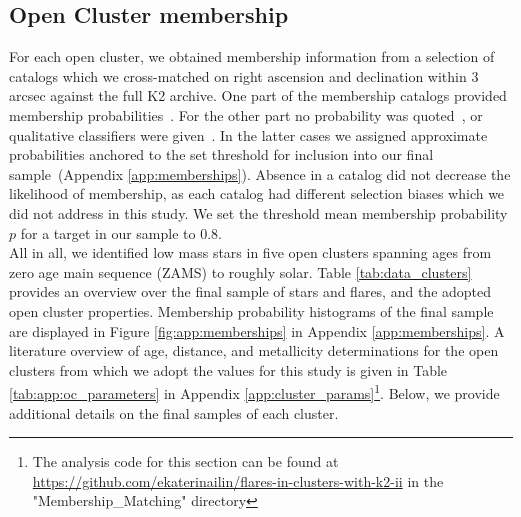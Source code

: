 \documentclass{aa}
\begin{document}
\subsection{Open Cluster membership}
\label{sec:sec:ocmem}
For each open cluster, we obtained membership information from a selection of catalogs which we cross-matched on right ascension and declination within 3 arcsec against the full K2 archive. One part of the membership catalogs provided membership probabilities~\citep{douglas_praesepe_hyades_2014, cantat_gaudin_2018, olivares_pleiades_2018, reino_hyades_2018, gao_m67mem_2018, olivares_ngc6774_2019}. For the other part no probability was quoted~\citep{rebull_pleiadesrot_2016, douglas_poking_2017, gaia_dr2_2018_hrd}, or qualitative classifiers were given~\citep{curtis2013, gonzalez_m67mem_2016,rebull_praesepe_2017}. In the latter cases we assigned approximate probabilities anchored to the set threshold for inclusion into our final sample~(Appendix \ref{app:memberships}). Absence in a catalog did not decrease the likelihood of membership, as each catalog had different selection biases which we did not address in this study. We set the threshold mean membership probability $p$ for a target in our sample to 0.8. 
\\
All in all, we identified low mass stars in five open clusters spanning ages from zero age main sequence (ZAMS) to roughly solar. Table \ref{tab:data_clusters} provides an overview over the final sample of stars and flares, and the adopted open cluster properties. Membership probability histograms of the final sample are displayed in Figure \ref{fig:app:memberships} in Appendix \ref{app:memberships}. A literature overview of age, distance, and metallicity determinations for the open clusters from which we adopt the values for this study is given in Table \ref{tab:app:oc_parameters} in Appendix \ref{app:cluster_params}\footnote{The analysis code for this section can be found at \url{https://github.com/ekaterinailin/flares-in-clusters-with-k2-ii} in the "Membership\_Matching" directory}. Below, we provide additional details on the final samples of each cluster.
\end{document}

